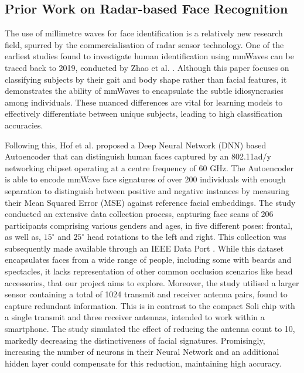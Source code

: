 \documentclass{interim}
\begin{document}
\subsection{Prior Work on Radar-based Face Recognition}
\label{background:prior_work}
The use of millimetre waves for face identification is a relatively new research field, spurred by the commercialisation of radar sensor technology. One of the earliest studies found to investigate human identification using mmWaves can be traced back to 2019, conducted by Zhao et al. \cite{zhao2019mid}. Although this paper focuses on classifying subjects by their gait and body shape rather than facial features, it demonstrates the ability of mmWaves to encapsulate the subtle idiosyncrasies among individuals. These nuanced differences are vital for learning models to effectively differentiate between unique subjects, leading to high classification accuracies.

Following this, Hof et al. \cite{hof2020face} proposed a Deep Neural Network (DNN) based Autoencoder that can distinguish human faces captured by an 802.11ad/y networking chipset operating at a centre frequency of 60 GHz. The Autoencoder is able to encode mmWave face signatures of over 200 individuals with enough separation to distinguish between positive and negative instances by measuring their Mean Squared Error (MSE) against reference facial embeddings. The study conducted an extensive data collection process, capturing face scans of 206 participants comprising various genders and ages, in five different poses: frontal, as well as, $15^\circ$ and $25^\circ$ head rotations to the left and right. This collection was subsequently made available through an IEEE Data Port \cite{mmwavefacedata}. While this dataset encapsulates faces from a wide range of people, including some with beards and spectacles, it lacks representation of other common occlusion scenarios like head accessories, that our project aims to explore. Moreover, the study utilised a larger sensor containing a total of 1024 transmit and receiver antenna pairs, found to capture redundant information. This is in contrast to the compact Soli chip with a single transmit and three receiver antennas, intended to work within a smartphone. The study simulated the effect of reducing the antenna count to 10, markedly decreasing the distinctiveness of facial signatures. Promisingly, increasing the number of neurons in their Neural Network and an additional hidden layer could compensate for this reduction, maintaining high accuracy.
\end{document}
